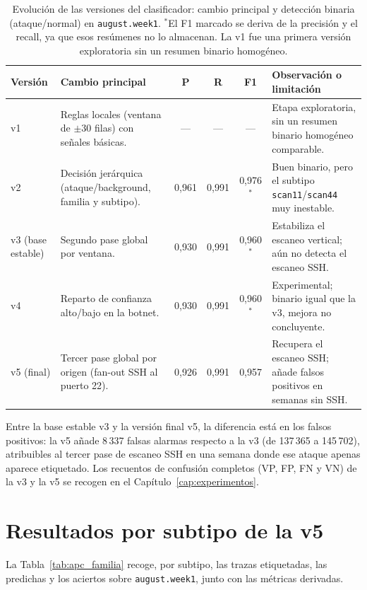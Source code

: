 \begin{table}[!htbp]
\centering
\small
\begin{tabular}{|l|p{4.4cm}|c|c|c|p{3.6cm}|}
\hline
\textbf{Versión} & \textbf{Cambio principal} & \textbf{P} & \textbf{R} & \textbf{F1} & \textbf{Observación o limitación} \\
\hline
v1 & Reglas locales (ventana de $\pm$30 filas) con señales básicas. & --- & --- & --- & Etapa exploratoria, sin un resumen binario homogéneo comparable. \\
\hline
v2 & Decisión jerárquica (ataque/background, familia y subtipo). & 0,961 & 0,991 & 0,976$^{*}$ & Buen binario, pero el subtipo \texttt{scan11}/\texttt{scan44} muy inestable. \\
\hline
v3 (base estable) & Segundo pase global por ventana. & 0,930 & 0,991 & 0,960$^{*}$ & Estabiliza el escaneo vertical; aún no detecta el escaneo SSH. \\
\hline
v4 & Reparto de confianza alto/bajo en la botnet. & 0,930 & 0,991 & 0,960$^{*}$ & Experimental; binario igual que la v3, mejora no concluyente. \\
\hline
v5 (final) & Tercer pase global por origen (fan-out SSH al puerto 22). & 0,926 & 0,991 & 0,957 & Recupera el escaneo SSH; añade falsos positivos en semanas sin SSH. \\
\hline
\end{tabular}
\caption{Evolución de las versiones del clasificador: cambio principal y detección binaria (ataque/normal) en \texttt{august.week1}. $^{*}$El F1 marcado se deriva de la precisión y el recall, ya que esos resúmenes no lo almacenan. La v1 fue una primera versión exploratoria sin un resumen binario homogéneo.}
\label{tab:apc_binaria}
\end{table}

Entre la base estable v3 y la versión final v5, la diferencia está en los falsos positivos: la v5 añade 8\,337 falsas alarmas respecto a la v3 (de 137\,365 a 145\,702), atribuibles al tercer pase de escaneo SSH en una semana donde ese ataque apenas aparece etiquetado. Los recuentos de confusión completos (VP, FP, FN y VN) de la v3 y la v5 se recogen en el Capítulo~\ref{cap:experimentos}.

\section{Resultados por subtipo de la v5}
\label{sec:apc_familia}

La Tabla~\ref{tab:apc_familia} recoge, por subtipo, las trazas etiquetadas, las predichas y los aciertos sobre \texttt{august.week1}, junto con las métricas derivadas.


